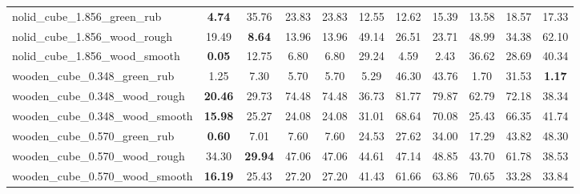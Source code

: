 \begin{table}[H]
{\begin{tabular}{l cccccccccc}
        nolid\_cube\_1.856\_green\_rub & \textbf{4.74} & 35.76 & 23.83 & 23.83 & 12.55 & 12.62 & 15.39 & 13.58 & 18.57 & 17.33 \\
        nolid\_cube\_1.856\_wood\_rough & 19.49 & \textbf{8.64} & 13.96 & 13.96 & 49.14 & 26.51 & 23.71 & 48.99 & 34.38 & 62.10 \\
        nolid\_cube\_1.856\_wood\_smooth & \textbf{0.05} & 12.75 & 6.80 & 6.80 & 29.24 & 4.59 & 2.43 & 36.62 & 28.69 & 40.34 \\
        wooden\_cube\_0.348\_green\_rub & 1.25 & 7.30 & 5.70 & 5.70 & 5.29 & 46.30 & 43.76 & 1.70 & 31.53 & \textbf{1.17} \\
        wooden\_cube\_0.348\_wood\_rough & \textbf{20.46} & 29.73 & 74.48 & 74.48 & 36.73 & 81.77 & 79.87 & 62.79 & 72.18 & 38.34 \\
        wooden\_cube\_0.348\_wood\_smooth & \textbf{15.98} & 25.27 & 24.08 & 24.08 & 31.01 & 68.64 & 70.08 & 25.43 & 66.35 & 41.74 \\
        wooden\_cube\_0.570\_green\_rub & \textbf{0.60} & 7.01 & 7.60 & 7.60 & 24.53 & 27.62 & 34.00 & 17.29 & 43.82 & 48.30 \\
        wooden\_cube\_0.570\_wood\_rough & 34.30 & \textbf{29.94} & 47.06 & 47.06 & 44.61 & 47.14 & 48.85 & 43.70 & 61.78 & 38.53 \\
        wooden\_cube\_0.570\_wood\_smooth & \textbf{16.19} & 25.43 & 27.20 & 27.20 & 41.43 & 61.66 & 63.86 & 70.65 & 33.28 & 33.84 \\
        \bottomrule
    \end{tabular}
    }
\end{table}
